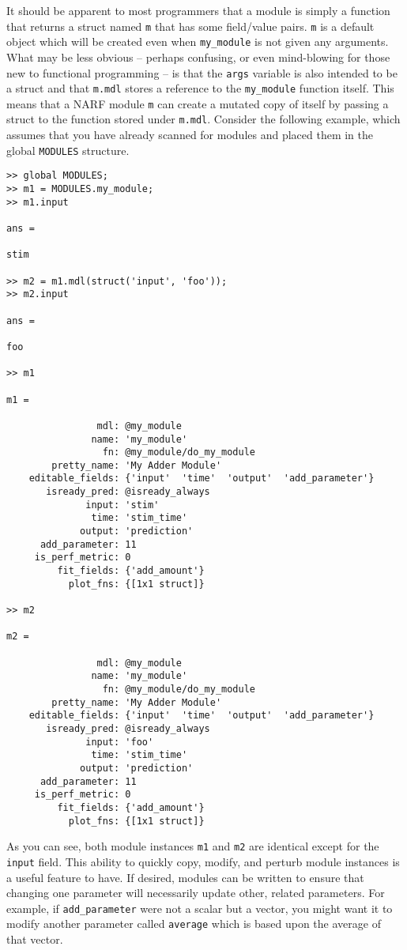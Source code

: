 \documentclass[letterpaper]{report}
\newcommand{\matlab}[1]{\texttt{#1}}
\begin{document}
It should be apparent to most programmers that a module is simply a function that returns a struct named \matlab{m} that has some field/value pairs. \matlab{m} is a default object which will be created even when \matlab{my\_module} is not given any arguments. What may be less obvious -- perhaps confusing, or even mind-blowing for those new to functional programming -- is that the \matlab{args} variable is also intended to be a struct and that \matlab{m.mdl} stores a reference to the \matlab{my\_module} function itself. This means that a NARF module \matlab{m} can create a mutated copy of itself by passing a struct to the function stored under \matlab{m.mdl}. Consider the following example, which assumes that you have already scanned for modules and placed them in the global \matlab{MODULES} structure.

\begin{verbatim}
>> global MODULES;
>> m1 = MODULES.my_module;
>> m1.input

ans =

stim

>> m2 = m1.mdl(struct('input', 'foo'));
>> m2.input

ans =

foo

>> m1

m1 = 

                mdl: @my_module
               name: 'my_module'
                 fn: @my_module/do_my_module
        pretty_name: 'My Adder Module'
    editable_fields: {'input'  'time'  'output'  'add_parameter'}
       isready_pred: @isready_always
              input: 'stim'
               time: 'stim_time'
             output: 'prediction'
      add_parameter: 11
     is_perf_metric: 0
         fit_fields: {'add_amount'}
           plot_fns: {[1x1 struct]}

>> m2

m2 = 

                mdl: @my_module
               name: 'my_module'
                 fn: @my_module/do_my_module
        pretty_name: 'My Adder Module'
    editable_fields: {'input'  'time'  'output'  'add_parameter'}
       isready_pred: @isready_always
              input: 'foo'
               time: 'stim_time'
             output: 'prediction'
      add_parameter: 11
     is_perf_metric: 0
         fit_fields: {'add_amount'}
           plot_fns: {[1x1 struct]}
\end{verbatim}

As you can see, both module instances \matlab{m1} and \matlab{m2} are identical except for the \matlab{input} field. This ability to quickly copy, modify, and perturb module instances is a useful feature to have. If desired, modules can be written to ensure that changing one parameter will necessarily update other, related parameters. For example, if \matlab{add\_parameter} were not a scalar but a vector, you might want it to modify another parameter called \matlab{average} which is based upon the average of that vector. 
\end{document}
